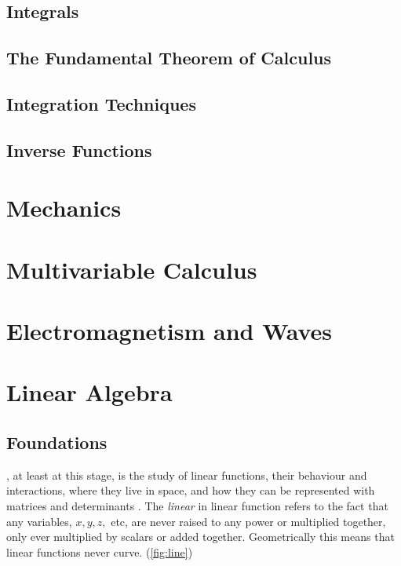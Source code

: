 \documentclass{tufte-book}
\begin{document}
\chapter{Integrals}
\chapter{The Fundamental Theorem of Calculus}
\chapter{Integration Techniques}
\chapter{Inverse Functions}
\part{Mechanics}
\part{Multivariable Calculus}
\part{Electromagnetism and Waves}
\part{Linear Algebra}

\chapter{Foundations}

, at least at this stage, is the study of linear functions, their behaviour and
interactions, where they live in space, and how they can be represented with matrices and determinants \cite{axler2015}.
The \emph{linear} in linear function refers to the fact that any variables, $x, y, z,$ etc, are never raised to any
power or multiplied together, only ever multiplied by scalars or added together. Geometrically this means that linear functions never curve. (\cref{fig:line})
\end{document}
